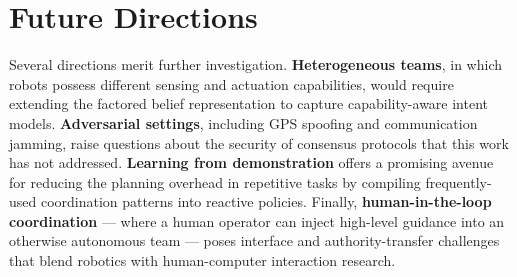 \section{Future Directions}

Several directions merit further investigation. \textbf{Heterogeneous teams},
in which robots possess different sensing and actuation capabilities, would
require extending the factored belief representation to capture capability-aware
intent models. \textbf{Adversarial settings}, including GPS spoofing and
communication jamming, raise questions about the security of consensus protocols
that this work has not addressed. \textbf{Learning from demonstration} offers a
promising avenue for reducing the planning overhead in repetitive tasks by
compiling frequently-used coordination patterns into reactive policies. Finally,
\textbf{human-in-the-loop coordination} --- where a human operator can inject
high-level guidance into an otherwise autonomous team --- poses interface and
authority-transfer challenges that blend robotics with human-computer interaction
research.

\appendix
